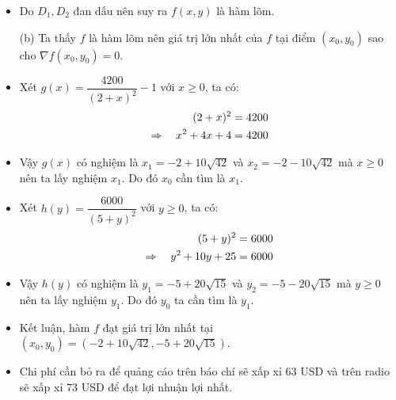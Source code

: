 \documentclass[a4paper, 12pt]{report}
\begin{document}
\begin{itemize}
    \item Do $D_1, D_2$ đan dấu nên suy ra $f(x, y)$ là hàm lõm. 

    \item[(b)] Ta thấy $f$ là hàm lõm nên giá trị lớn nhất của $f$ tại điểm $(x_0, y_0)$ sao cho $\nabla f(x_0, y_0) = 0$. 

    \item Xét $g(x) = \dfrac{4200}{(2+x)^2} - 1$ với $x \geq 0$, ta có:
    $$
    \begin{aligned}
    (2+x)^2 &= 4200 \\
    \implies \hspace*{10pt} x^2 + 4x + 4 &= 4200
    \end{aligned}
    $$

    \item Vậy $g(x)$ có nghiệm là $x_1 = -2 + 10\sqrt{42}$ và $x_2 = -2 - 10\sqrt{42}$ mà $x \geq 0$ nên ta lấy nghiệm $x_1$. Do đó $x_0$ cần tìm là $x_1$.

    \item Xét $h(y) = \dfrac{6000}{(5+y)^2}$ với $y \geq 0$, ta có:
    $$
    \begin{aligned}
    (5+y)^2 &= 6000 \\
    \implies \hspace*{10pt} y^2 + 10y + 25 &= 6000
    \end{aligned}
    $$

    \item Vậy $h(y)$ có nghiệm là $y_1 = -5 + 20\sqrt{15}$ và $y_2 = -5 - 20\sqrt{15}$ mà $y \geq 0$ nên ta lấy nghiệm $y_1$. Do đó $y_0$ ta cần tìm là $y_1$.

    \item Kết luận, hàm $f$ đạt giá trị lớn nhất tại $(x_0, y_0) = (-2 + 10\sqrt{42}, -5 + 20\sqrt{15})$.

    \item Chi phí cần bỏ ra để quảng cáo trên báo chí sẽ xấp xỉ $63$ USD và trên radio sẽ xấp xỉ $73$ USD để đạt lợi nhuận lợi nhất.
\end{itemize}
\end{document}
